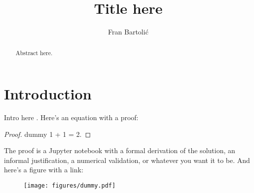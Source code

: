 \documentclass[modern]{aastex62}
\begin{document}
\title{Title here}

\author{Fran Bartoli\'c}
%

\begin{abstract} 
Abstract here.
%
\href{https://github.com/rodluger/starrynight}{\color{linkcolor}\faGithub}
\end{abstract}

%
\section{Introduction}
%
Intro here \citep{Luger2019}.
Here's an equation with a proof:
%
\begin{proof}{dummy}
    \label{eq:dummy}
    1 + 1 = 2.
\end{proof}
The proof is a Jupyter notebook with a formal derivation of the solution,
an informal justification, a numerical validation, or whatever you want it
to be.
%
And here's a figure with a link:
%
\begin{figure}[h!]
    \begin{centering}
    \texttt{[image: figures/dummy.pdf]}
    \end{centering}
\end{figure}


\end{document}
